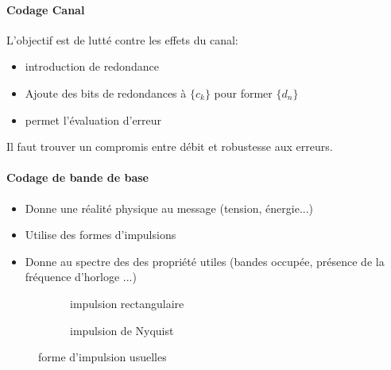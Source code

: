 \documentclass[main.tex]{subfiles}
\begin{document}
\paragraph{Codage Canal}
L'objectif est de lutté contre les effets du canal:
\begin{itemize}
\item introduction de redondance
\item Ajoute des bits de redondances à $\{c_k\}$ pour former $\{d_n\}$
\item permet l'évaluation d'erreur
\end{itemize}
Il faut trouver un compromis entre débit et robustesse aux erreurs.
\paragraph{Codage de bande de base}
\begin{itemize}
\item Donne une réalité physique au message (tension, énergie...)
\item Utilise des formes d'impulsions
\item Donne au spectre des des propriété utiles (bandes occupée, présence de la fréquence d'horloge ...)
\end{itemize}

\begin{figure}[H]
  \centering
  \begin{subfigure}{0.5\textwidth}
    \centering
    \caption{impulsion rectangulaire}
    \label{fig:label}
  \end{subfigure}%
  \begin{subfigure}{0.5\textwidth}
    \centering
    \caption{impulsion de Nyquist}
    \label{fig:label}
  \end{subfigure}
  \caption{forme d'impulsion usuelles}
\end{figure}
\end{document}
